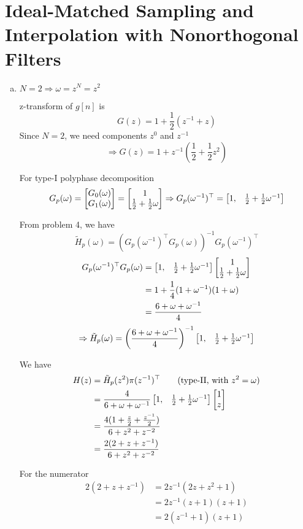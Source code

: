 \section{Ideal-Matched Sampling and Interpolation with Nonorthogonal Filters}\label{sec:p5}

\begin{enumerate}[(a)]
\item $N=2 \Rightarrow \omega = z^N = z^2$

z-transform of $g[n]$ is
\[G(z) = 1 +\frac{1}{2}(z^{-1}+z)\]
Since $N=2$, we need components $z^0$ and $z^{-1}$
\[\Rightarrow G(z) = 1 + z^{-1}\left(\frac{1}{2} + \frac{1}{2}z^2\right)\]

For type-I polyphase decomposition
\[G_p(\omega) = \begin{bmatrix} G_0(\omega) \\ G_1(\omega) \end{bmatrix} = \begin{bmatrix} 1 \\ \frac{1}{2} + \frac{1}{2}\omega \end{bmatrix} \Rightarrow G_p(\omega^{-1})^\top = \begin{bmatrix} 1, & \frac{1}{2} + \frac{1}{2}\omega^{-1} \end{bmatrix}\]

From problem 4, we have
\[\tilde{H}_p(\omega) = \left(G_p(\omega^{-1})^\top G_p(\omega)\right)^{-1} G_p(\omega^{-1})^\top\]
\begin{align*}
	G_p(\omega^{-1})^\top G_p(\omega)
	&= \begin{bmatrix} 1, & \frac{1}{2} + \frac{1}{2}\omega^{-1} \end{bmatrix} \begin{bmatrix} 1 \\ \frac{1}{2} + \frac{1}{2}\omega \end{bmatrix} \\
	&= 1 + \frac{1}{4}(1+\omega^{-1})(1+\omega) \\
	&= \frac{6 + \omega + \omega^{-1}}{4}
\end{align*}
\[\Rightarrow \tilde{H}_p(\omega) = \left(\frac{6 + \omega + \omega^{-1}}{4}\right)^{-1} \begin{bmatrix} 1, & \frac{1}{2} + \frac{1}{2}\omega^{-1} \end{bmatrix} \]

We have 
\begin{align*}
	H(z) 
	&= \tilde{H}_p(z^2) \pi(z^{-1})^\top \qquad (\text{type-II, with }z^2 = \omega)\\
	&= \frac{4}{6 + \omega + \omega^{-1}} \begin{bmatrix} 1, & \frac{1}{2} + \frac{1}{2}\omega^{-1} \end{bmatrix}\begin{bmatrix} 1 \\ z \end{bmatrix} \\
	&= \frac{4(1+\frac{z}{2} + \frac{z^{-1}}{2})}{6 + z^2 + z^{-2}} \\
	&= \frac{2(2 + z + z^{-1})}{6 + z^2 + z^{-2}}
\end{align*}

For the numerator
\begin{align*}
	2(2 + z + z^{-1}) 
	&= 2z^{-1}(2z + z^2 + 1) \\
	&= 2z^{-1}(z+1)(z+1) \\
	&= 2(z^{-1}+1)(z+1)
\end{align*}


\end{enumerate}
